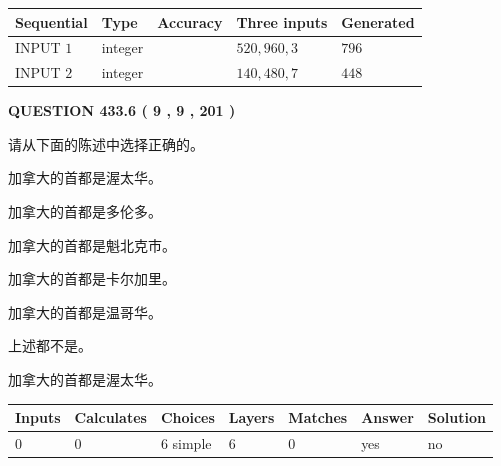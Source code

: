 \documentclass{ctexart}
\begin{document}
   
  
  
\noindent\begin{tabular}{|l|l|l|l|l|}
\hline
 Sequential & Type & Accuracy & Three inputs & Generated \\ 
\hline
 
 
  INPUT $  1 $ & integer &  & $
 520
 , 
 960
 , 
 3
 $ & $ 796 $ 
 \\  \hline  
 
 
  INPUT $  2 $ & integer &  & $
 140
 , 
 480
 , 
 7
 $ & $ 448 $ 
 \\  \hline  
 \end{tabular}
   
   
  
\vspace{0.2in}
  
{\textbf{\Large{QUESTION
433.6 
 ( 9 , 9 , 201 )
}}}
  
  
请从下面的陈述中选择正确的。
 
 
加拿大的首都是渥太华。
 
 
加拿大的首都是多伦多。
 
 
加拿大的首都是魁北克市。
 
 
加拿大的首都是卡尔加里。
 
 
加拿大的首都是温哥华。
 
 
 上述都不是。
 
 
\noindent{}
 
 
加拿大的首都是渥太华。
 
 
\noindent{}
 
 
   
   
   
   
\noindent\begin{tabular}{|l|l|l|l|l|l|l|}
 \hline
Inputs & Calculates & Choices & Layers & Matches & Answer & Solution \\ \hline
 0  & 
 0  & 
 6
  simple  
  & 
 6  & 
 0  & 
  yes & 
  no 
  \\ \hline
 \end{tabular}
   
   
   
   
\noindent{}
   
\end{document}
